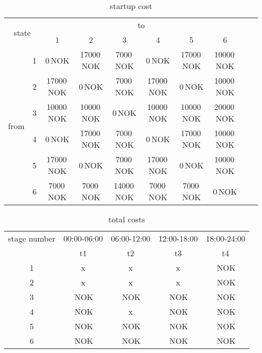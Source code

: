 \documentclass{article}
\begin{document}
	\begin{table}[hbt!]
\begin{center}
\begin{tabular}[h]{|c|c||c|c|c|c|c|c|c|c|}
\hline 
\multicolumn{2}{|c|}{\multirow{2}{*}{state}}&\multicolumn{6}{|c|}{to}\\
		\cline{3-8}
    \multicolumn{2}{|c|}{}&1 & 2 & 3 & 4 & 5 & 6 \\
\hline
\hline
\multirow{6}{*}{from}
	& 1 & 0\,NOK 		& 17000\,NOK 	& 7000\,NOK 	& 0\,NOK 		& 17000\,NOK 		& 10000\,NOK\\
	\cline{3-8}
	& 2 & 17000\,NOK 	& 0\,NOK 		& 7000\,NOK 	& 17000\,NOK 	& 0\,NOK 			& 10000\,NOK\\
	\cline{3-8}
	& 3 & 10000\,NOK 	& 10000\,NOK 	& 0\,NOK 		& 10000\,NOK 	& 10000\,NOK 		& 20000\,NOK\\
	\cline{3-8}
	& 4 & 0\,NOK 		& 17000\,NOK 	& 7000\,NOK 	& 0\,NOK 		& 17000\,NOK 		& 10000\,NOK\\
	\cline{3-8}
	& 5 & 17000\,NOK 	& 0\,NOK 		& 7000\,NOK 	& 17000\,NOK 	& 0\,NOK 			& 10000\,NOK\\
	\cline{3-8}
	& 6 & 7000\,NOK 	& 7000\,NOK 	& 14000\,NOK 	& 7000\,NOK 	& 7000\,NOK 		& 0\,NOK\\
\hline
\end{tabular}
\caption{startup cost}\label{tab:startcost}
\end{center}
\end{table}

	\begin{table}[hbt!]
\begin{center}
\begin{tabular}[h]{|c||c|c|c|c|}
\hline 
stage number  						&				00:00-06:00		&	06:00-12:00		&		12:00-18:00		&		18:00-24:00\\
\cline{2-5}
									&					t1			&		t2			&			t3			&			t4		\\
\hline
\hline
1 				&				x				&	x				&		x				&		\,NOK\\
\hline
2  				&				x				&	x				&		x				&		\,NOK\\
\hline	
3  				&				\,NOK 	& 	\,NOK 	& 		\,NOK 	& 		\,NOK\\
\hline
4 	 			&				\,NOK		&	x				&		\,NOK		&		\,NOK\\
\hline
5 	 			&				\,NOK		&	\,NOK		&		\,NOK		&		\,NOK\\
\hline
6 	 			&				\,NOK		&	\,NOK		&		\,NOK		&		\,NOK\\
\hline
\end{tabular}
\caption{total costs}\label{tab:totcost}
\end{center}
\end{table}
\end{document}
